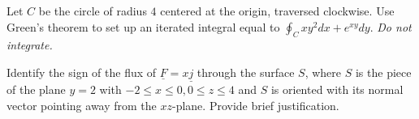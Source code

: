 \documentclass[12pt,letterpaper,noanswers]{exam}
\newcommand{\mb}[1]{\underline{#1}}
\begin{document}
 \pdfpageheight 11in 
  \pdfpagewidth 8.5in



\begin{questions}
\question Let $C$ be the circle of radius $4$ centered at the origin, traversed clockwise.  Use Green's theorem to set up an iterated integral equal to $\displaystyle\oint_C xy^2 dx + e^{xy} dy$.  \emph{Do not integrate.}

\vfill

\item Identify the sign of the flux of $\mb F = x\mb j$ through the surface $S$, where $S$ is the piece of the plane $y = 2$ with $-2\leq x \leq 0, 0\leq z\leq 4$ and $S$ is oriented with its normal vector pointing away from the $xz$-plane.  Provide brief justification.

\vfill


\end{questions}
\end{document}
